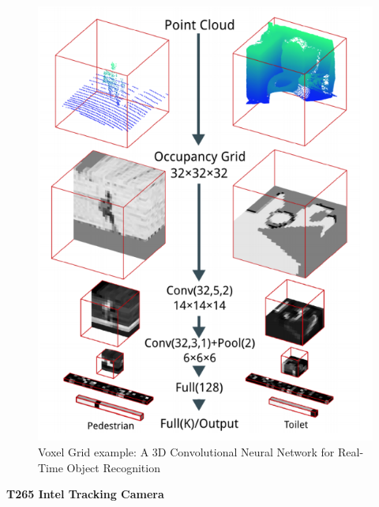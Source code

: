 \begin{figure}[H]
    \centering
    \includegraphics[scale=0.25]{Images/Chapter 3/voxelgrid.png}
    \caption{Voxel Grid example: A 3D Convolutional Neural Network for Real-Time Object Recognition}
    \label{fig:voxel}
\end{figure}


\textbf{T265 Intel Tracking Camera}

